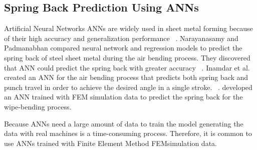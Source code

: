 \subsection*{Spring Back Prediction Using ANNs}

Artificial Neural Networks \ac{ANN}s are widely used in sheet metal forming because of their high accuracy and
generalization performance
~\cite[p. 2]{cruz_applicationmachinelearning_2021}.
Narayanasamy and Padmanabhan compared neural network and regression models to predict the spring back of steel sheet
metal during the air bending process.
They discovered that ANN could predict the spring back with greater accuracy
~\cite{narayanasamy_comparisonregressionartificial_2012a}.
Inamdar et al. created an ANN for the air bending process that predicts both spring back and punch travel in order to
achieve the desired angle in a single stroke.
~\cite{inamdar_developmentartificialneural_2000}.
\cite{kazan_predictionspringbackwipebending_2009} developed an ANN trained with FEM simulation data to predict the
spring back for the wipe-bending process.

Because \ac{ANN}s need a large amount of data to train the model generating the data
with real machines is a time-consuming process.
Therefore, it is common to use \ac{ANN}s trained with Finite Element Method \ac{FEM}simulation data.